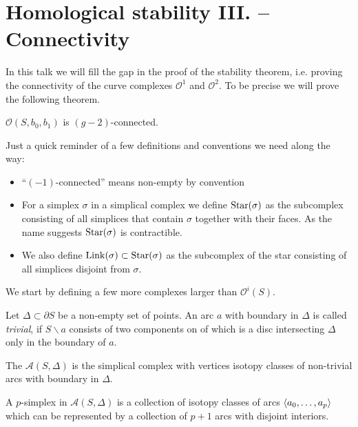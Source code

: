 \renewcommand{\setminus}{\backslash}
\section{Homological stability III. -- Connectivity}
In this talk we will fill the gap in the proof of the stability theorem, i.e. proving the connectivity of the curve complexes $\mathcal{O}^1$ and $\mathcal{O}^2$.
To be precise we will prove the following theorem.

\begin{theorem*}
	$\mathcal{O}(S,b_0,b_1)$ is $(g-2)$-connected.
\end{theorem*}

\begin{remark*}
	Just a quick reminder of a few definitions and conventions we need along the way:
	\begin{itemize}[itemsep=0pt]
		\item \enquote{$(-1)$-connected} means non-empty by convention
		\item For a simplex $\sigma$ in a simplical complex we define
		\(
			\Star(\sigma)
		\)
		as the subcomplex consisting of all simplices that contain $\sigma$ together with their faces.
		As the name suggests $\Star(\sigma)$ is contractible.
		\item We also define $\Link(\sigma) \subset \Star(\sigma)$ as the subcomplex of the star consisting of all simplices disjoint from $\sigma$.
	\end{itemize}
\end{remark*}

We start by defining a few more complexes larger than $\mathcal{O}^i(S)$.

Let $\Delta \subset \partial S$ be a non-empty set of points.
An arc $a$ with boundary in $\Delta$ is called \emph{trivial}, if $S \setminus a$ consists of two components on of which is a disc intersecting $\Delta$ only in the boundary of $a$.

\begin{definition*}
	The  $\mathcal{A}(S,\Delta)$ is the simplical complex with vertices isotopy classes of non-trivial arcs with boundary in $\Delta$.
\end{definition*}
A $p$-simplex in $\mathcal{A}(S,\Delta)$ is a collection of isotopy classes of arcs $\angbrace*{a_0, \ldots ,a_p}$ which can be represented by a collection of $p+1$ arcs with disjoint interiors.

